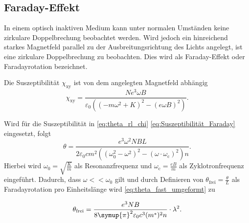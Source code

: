 \subsection{Faraday-Effekt}
\label{subsec:Faraday-Effekt}
In einem optisch inaktiven Medium kann unter normalen Umständen keine zirkulare Doppelbrechung beobachtet werden. Wird jedoch ein hinreichend starkes Magnetfeld parallel
zu der Ausbreitungsrichtung des Lichts angelegt, ist eine zirkulare Doppelbrechung zu beobachten. Dies wird als Faraday-Effekt oder Faradayrotation bezeichnet.

Die Suszeptibilität $\chi_\text{xy}$ ist von dem angelegten Magnetfeld abhängig
\begin{equation}
    \chi_\text{xy} = \frac{Ne^3\omega B}{\varepsilon_0\left(\left(-m\omega^2+K\right)^2-\left(e\omega B\right)^2\right)}.
    \label{eq:Suszeptibilität_Faraday}
\end{equation}

Wird für die Suszeptibilität in \eqref{eq:theta_rl_chi} \autoref{eq:Suszeptibilität_Faraday} eingesetzt, folgt
\begin{equation}
    \theta = \frac{e^3\omega^2 NBL} {2\varepsilon_0 cm^2\left(\left(\omega_0^2-\omega^2\right)^2-\left(\omega \cdot \omega_\text{c}\right)^2\right)n}.
    \label{eq:theta_fast_umgeformt}
\end{equation}
Hierbei wird $\omega_0 = \sqrt{\frac{K}{m}}$ als Resonanzfrequenz und $\omega_\text{c} = \frac{eB}{m}$ als Zyklotronfrequenz eingeführt. Dadurch, dass $\omega << \omega_0$ gilt
und durch Definieren von $\theta_\text{frei} = \frac{\theta}{L}$ als Faradayrotation pro Einheitslänge wird \autoref{eq:theta_fast_umgeformt} zu

\begin{equation}
    \label{eqn:theta_l2}
    \theta_\text{frei} = \frac{e^3 N B}{8\symup{\pi}^2 \varepsilon_0 c^3 (m^*)^2 n} \cdot \lambda^2.
\end{equation}
